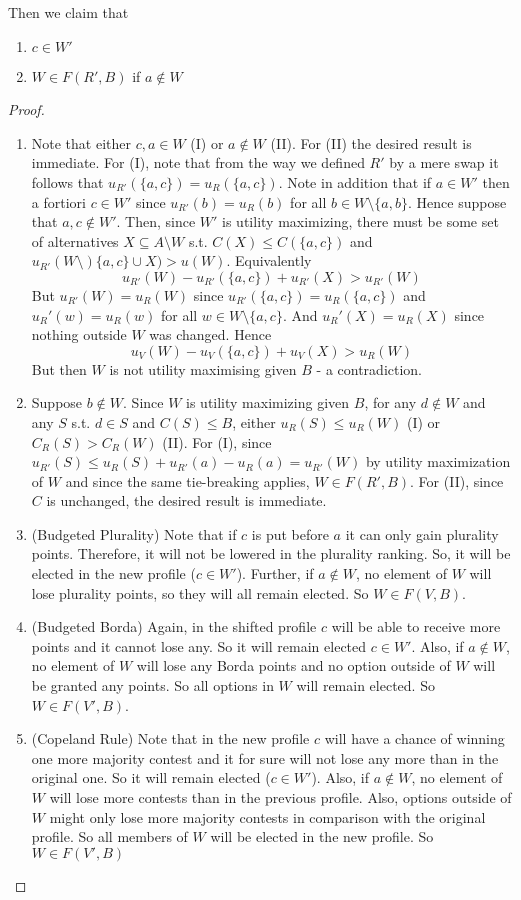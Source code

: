 \documentclass{article}
\begin{document}
Then we claim that
\begin{enumerate}
\item $c\in W'$
\item $W\in F(R',B)$ if $a\notin W$
\end{enumerate}
\begin{proof}
	

\begin{enumerate}
\item Note that either $c,a \in W$ (I) or $a\notin W$ (II). For (II) the desired result is immediate. For (I), note that from the way we defined $R'$ by a mere swap it follows that $u_{R'}(\{a,c\})=u_R(\{a,c\})$. Note in addition that if $a\in W'$ then a fortiori $c\in W'$ since $u_{R'}(b)=u_R(b)$ for all $b\in W\setminus \{a,b\}$. Hence suppose that $a,c\notin W'$. Then, since $W'$ is utility maximizing, there must be some set of alternatives $X\subseteq A\setminus W$ s.t. $C(X)\leq C(\{a,c\})$ and $u_{R'}(W\setminus)\{a,c\}\cup X)>u(W)$. Equivalently \[u_{R'}(W)-u_{R'}(\{a,c\})+u_{R'}(X)>u_{R'}(W)\] But $u_{R'}(W)=u_{R}(W)$ since $u_{R'}(\{a,c\})=u_R(\{a,c\})$ and $u_R'(w)=u_R(w)$ for all $w\in W\setminus \{a,c\}$. And $u_R'(X)=u_R(X)$ since nothing outside $W$ was changed. Hence \[u_V(W)-u_V(\{a,c\})+u_V(X)>u_R(W)\] But then $W$ is not utility maximising given $B$ - a contradiction.

\item Suppose $b\notin W$. Since $W$ is utility maximizing given $B$, for any $d\notin W$ and any $S$ s.t. $d\in S$ and $C(S)\leq  B$, either $u_R(S)\leq u_R(W)$ (I) or $C_R(S)>C_R(W)$ (II). For (I), since $u_{R'}(S) \leq  u_{R}(S)+ u_{R'}(a)- u_{R}(a)= u_{R'}(W)$ by utility maximization of $W$ and since the same tie-breaking applies, $W\in F(R',B)$. For (II), since $C$ is unchanged, the desired result is immediate.

\item (Budgeted Plurality)
Note that if $c$ is put before $a$ it can only gain plurality points. Therefore, it will not be lowered in the plurality ranking. So, it will be elected in the new profile ($c \in W'$). Further, if $a \notin W$, no element of $W$ will lose plurality points, so they will all remain elected. So $W \in F(V,B)$.  
\item (Budgeted Borda)
Again, in the shifted profile $c$ will be able to receive more points and it cannot lose any. So it will remain elected $c \in W'$. Also, if $a \notin W$, no element of $W$ will lose any Borda points and no option outside of $W$ will be granted any points. So all options in $W$ will remain elected. So $W \in F(V',B)$.
\item (Copeland Rule)
Note that in the new profile $c$ will have a chance of winning one more majority contest and it for sure will not lose any more than in the original one. So it will remain elected ($c \in W'$). Also, if $a \notin W$, no element of $W$ will lose more contests than in the previous profile. Also, options outside of $W$ might only lose more majority contests in comparison with the original profile. So all members of $W$ will be elected in the new profile. So $W \in F(V',B)$

\end{enumerate}

\end{proof}
\end{document}
